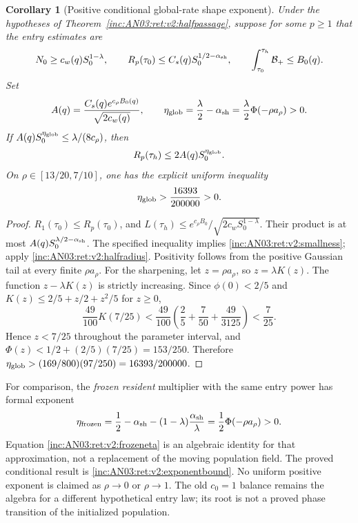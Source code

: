\documentclass[11pt]{article}
\numberwithin{equation}{section}
\newtheorem{corollary}[theorem]{Corollary}
\theoremstyle{remark}\newtheorem{remark}[theorem]{Remark}
\newcommand{\1}{\mathbf 1}
\begin{document}
\begin{corollary}[Positive conditional global-rate shape exponent]
\label{inc:AN03:ret:v2:exponent}
Under the hypotheses of Theorem~\ref{inc:AN03:ret:v2:halfpassage}, suppose
for some $p\ge1$ that the \emph{entry} estimates are
\begin{equation}\label{inc:AN03:ret:v2:entryhyp}
 N_0\ge c_w(q)S_0^{1-\lambda},\qquad
 R_p(\tau_0)\le C_s(q)S_0^{1/2-\alpha_{\rm sh}},\qquad
 \int_{\tau_0}^{\tau_h}\mathcal B_+\le B_0(q).
\end{equation}
Set
\[
 A(q)=\frac{C_s(q)e^{c_\rho B_0(q)}}{\sqrt{2c_w(q)}},
 \qquad
 \eta_{\rm glob}=\frac\lambda2-\alpha_{\rm sh}
 =\frac\lambda2\Phi(-\rho a_\rho)>0.
\]
If $A(q)S_0^{\eta_{\rm glob}}\le\lambda/(8c_\rho)$, then
\begin{equation}\label{inc:AN03:ret:v2:exponentbound}
 R_p(\tau_h)\le2A(q)S_0^{\eta_{\rm glob}}.
\end{equation}
On $\rho\in[13/20,7/10]$, one has the explicit uniform inequality
\begin{equation}\label{inc:AN03:ret:v2:uniformeta}
 \eta_{\rm glob}>\frac{16393}{200000}>0.
\end{equation}
\end{corollary}
\begin{proof}
$R_1(\tau_0)\le R_p(\tau_0)$, and
$L(\tau_h)\le e^{c_\rho B_0}/\sqrt{2c_wS_0^{1-\lambda}}$.
Their product is at most $A(q)S_0^{\lambda/2-\alpha_{\rm sh}}$.
The specified inequality implies
\eqref{inc:AN03:ret:v2:smallness}; apply
\eqref{inc:AN03:ret:v2:halfradius}.
Positivity follows from the positive Gaussian tail at every finite
$\rho a_\rho$. For the sharpening, let $z=\rho a_\rho$, so $z=\lambda K(z)$.
The function $z-\lambda K(z)$ is strictly increasing. Since $\phi(0)<2/5$
and $K(z)\le2/5+z/2+z^2/5$ for $z\ge0$,
\[
 \frac{49}{100}K(7/25)
 <\frac{49}{100}\left(\frac25+\frac7{50}+\frac{49}{3125}\right)
 <\frac7{25}.
\]
Hence $z<7/25$ throughout the parameter interval, and
$\Phi(z)<1/2+(2/5)(7/25)=153/250$. Therefore
$\eta_{\rm glob}>(169/800)(97/250)=16393/200000$.
\end{proof}

For comparison, the \emph{frozen resident} multiplier with the same entry
power has formal exponent
\begin{equation}\label{inc:AN03:ret:v2:frozeneta}
 \eta_{\rm frozen}
 =\frac12-\alpha_{\rm sh}-(1-\lambda)\frac{\alpha_{\rm sh}}\lambda
 =\frac12\Phi(-\rho a_\rho)>0.
\end{equation}
Equation \eqref{inc:AN03:ret:v2:frozeneta} is an algebraic identity for
that approximation, not a replacement of the moving population field.
The proved conditional result is \eqref{inc:AN03:ret:v2:exponentbound}.
No uniform positive exponent is claimed as $\rho\to0$ or $\rho\to1$.
The old $c_0=1$ balance remains the algebra for a different hypothetical
entry law; its root is not a proved phase transition of the initialized
population.
\end{document}
